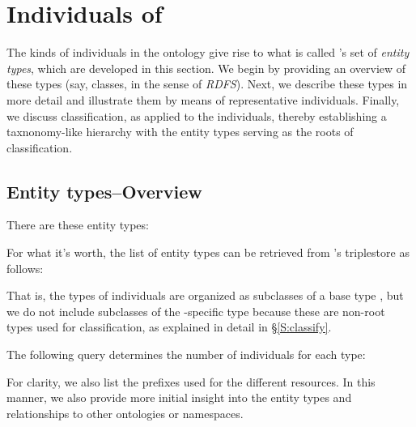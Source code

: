 
\section{Individuals of \solasote}
\label{S:individuals}

The kinds of individuals in the ontology give rise to what is called
\solasote's set of \emph{entity types}, which are developed in this
section. We begin by providing an overview of these types (say,
classes, in the sense of \emph{RDFS}). Next, we describe these types
in more detail and illustrate them by means of representative
individuals. Finally, we discuss classification, as applied to the
individuals, thereby establishing a taxnonomy-like hierarchy with the
entity types serving as the roots of classification.


\subsection{Entity types--Overview}

There are these entity types:


\noindent
For what it's worth, the list of entity types can be retrieved from
\solasote's triplestore as follows:


\noindent
That is, the types of individuals are organized as subclasses of a
base type , but we do not include subclasses of the
\solasote-specific type  because these are
non-root types used for classification, as explained in detail in
\S\ref{S:classify}.

The following query determines the number of individuals for each
type:



\noindent
For clarity, we also list the prefixes used for the different
\solasote{} resources. In this manner, we also provide more initial
insight into the entity types and relationships to other ontologies or
namespaces.

